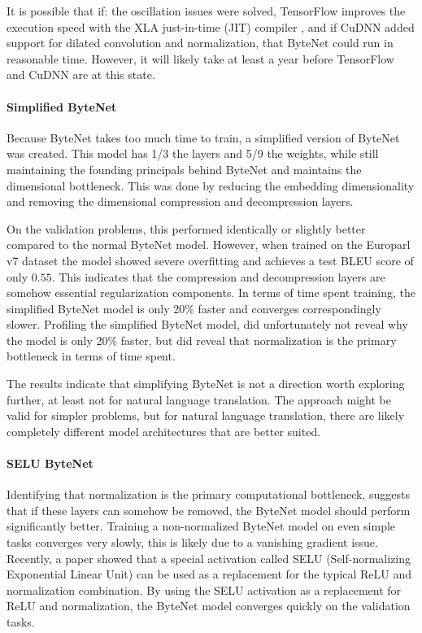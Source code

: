 It is possible that if: the oscillation issues were solved, TensorFlow improves the execution speed with the XLA just-in-time (JIT) compiler \cite{google-xla}, and if CuDNN added support for dilated convolution and normalization, that ByteNet could run in reasonable time. However, it will likely take at least a year before TensorFlow and CuDNN are at this state.

\paragraph{Simplified ByteNet} Because ByteNet takes too much time to train, a simplified version of ByteNet was created. This model has 1/3 the layers and 5/9 the weights, while still maintaining the founding principals behind ByteNet and maintains the dimensional bottleneck. This was done by reducing the embedding dimensionality and removing the dimensional compression and decompression layers.

On the validation problems, this performed identically or slightly better compared to the normal ByteNet model. However, when trained on the Europarl v7 dataset the model showed severe overfitting and achieves a test BLEU score of only $0.55$. This indicates that the compression and decompression layers are somehow essential regularization components. In terms of time spent training, the simplified ByteNet model is only 20\% faster and converges correspondingly slower. Profiling the simplified ByteNet model, did unfortunately not reveal why the model is only 20\% faster, but did reveal that normalization is the primary bottleneck in terms of time spent.

The results indicate that simplifying ByteNet is not a direction worth exploring further, at least not for natural language translation. The approach might be valid for simpler problems, but for natural language translation, there are likely completely different model architectures that are better suited.

\paragraph{SELU ByteNet} Identifying that normalization is the primary computational bottleneck, suggests that if these layers can somehow be removed, the ByteNet model should perform significantly better. Training a non-normalized ByteNet model on even simple tasks converges very slowly, this is likely due to a vanishing gradient issue. Recently, a paper showed that a special activation called SELU (Self-normalizing Exponential Linear Unit) can be used as a replacement for the typical ReLU and normalization combination. By using the SELU activation as a replacement for ReLU and normalization, the ByteNet model converges quickly on the validation tasks.

